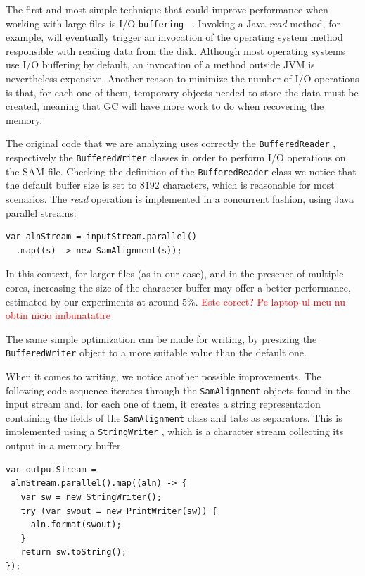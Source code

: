 \documentclass[a4paper,twoside]{article}
\begin{document}
The first and most simple technique that could improve performance when working with large files
is I/O {\texttt{buffering} }~\cite{oaks:2014}.
Invoking a Java {\textit{read} } method, for example, will eventually trigger an invocation of the operating system method responsible with reading data from the disk.
Although most operating systems use I/O buffering by default, an invocation of a method outside JVM is nevertheless expensive.
Another reason to minimize the number of I/O operations is that, for each one of them, temporary objects needed to store the data must be created, meaning that GC will have more work to do when recovering the memory.

The original code that we are analyzing uses correctly the {\texttt{BufferedReader} }, respectively the {\texttt{BufferedWriter} } classes in order to perform I/O operations on the SAM file.
Checking the definition of the {\texttt{BufferedReader} } class we notice that the default buffer size is set to $8192$ characters, which is reasonable for most scenarios.
The {\textit{read} } operation is implemented in a concurrent fashion, using Java parallel streams:
\begin{verbatim}
var alnStream = inputStream.parallel()
  .map((s) -> new SamAlignment(s));
\end{verbatim}
In this context, for larger files (as in our case), and in the presence of multiple cores, increasing the size of the character buffer may offer a better performance, estimated by our experiments at around $5\%$. \textcolor{red}{Este corect?
Pe laptop-ul meu nu obtin nicio imbunatatire}

The same simple optimization can be made for writing, by presizing the {\texttt{BufferedWriter} } object to a more suitable value than the default one.

When it comes to writing, we notice another possible improvements.
The following code sequence iterates through the {\texttt{SamAlignment} } objects found in the input stream and, for each one of them, it creates a string representation containing the fields of the  {\texttt{SamAlignment} } class and tabs as separators.
This is implemented using a {\texttt{StringWriter} }, which is a character stream collecting its output in a memory buffer.
\begin{verbatim}
var outputStream = 
 alnStream.parallel().map((aln) -> {
   var sw = new StringWriter();
   try (var swout = new PrintWriter(sw)) {
     aln.format(swout);
   }
   return sw.toString();
});
\end{verbatim}
\end{document}
